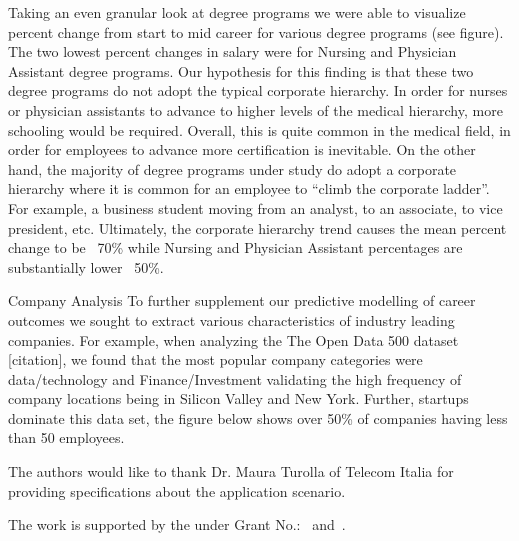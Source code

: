 Taking an even granular look at degree programs we were able to visualize percent change from start to mid career for various degree programs (see figure). The two lowest percent changes in salary were for Nursing and Physician Assistant degree programs. Our hypothesis for this finding is that these two degree programs do not adopt the typical corporate hierarchy. In order for nurses or physician assistants to advance to higher levels of the medical hierarchy, more schooling would be required. Overall, this is quite common in the medical field, in order for employees to advance more certification is inevitable. On the other hand, the majority of degree programs under study do adopt a corporate hierarchy where it is common for an employee to  “climb the corporate ladder”. For example, a business student moving from an analyst, to an associate, to vice president, etc. Ultimately, the corporate hierarchy trend causes the mean percent change to be ~70\% while Nursing and Physician Assistant percentages are substantially lower ~50\%. 

Company Analysis 
To further supplement our predictive modelling of career outcomes we sought to extract various characteristics of industry leading companies. For example, when analyzing the The Open Data 500 dataset [citation], we found that the most popular company categories were data/technology and Finance/Investment validating the high frequency of company locations being in Silicon Valley and New York. Further, startups dominate this data set, the figure below shows over 50\% of companies having less than 50 employees.


\begin{acks}

The authors would like to thank Dr. Maura Turolla of Telecom
Italia for providing specifications about the application scenario.

The work is supported by the  under Grant
No.:~
and~.


\end{acks}




